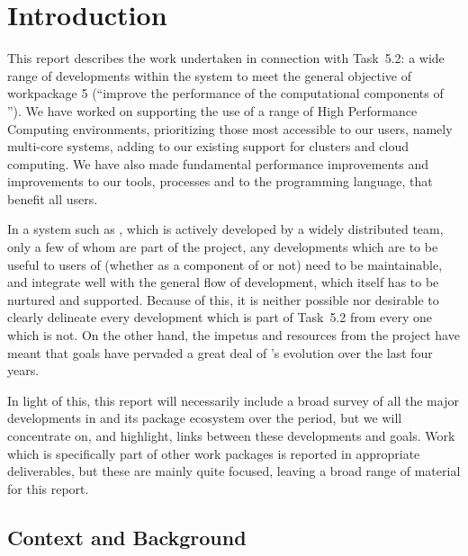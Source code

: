 

\section{Introduction}
This report describes the work undertaken in connection with Task~5.2:
  a wide range of developments within the \GAP system to meet the
  general objective of workpackage 5 (``improve the performance of the
  computational components of \ODK''). We have worked on supporting
  the use of a range of High Performance Computing environments,
  prioritizing those most accessible to our users, namely multi-core
  systems, adding to our existing support for clusters and cloud
  computing. We have also made fundamental performance improvements
  and improvements to our tools, processes and to the programming
  language, that benefit all \GAP users.

In a system such as \GAP, which is actively developed by a widely
distributed team, only a few of whom are part of the \ODK project, any
developments which are to be useful to users of \GAP (whether as a component of
\ODK or not) need to be maintainable, and
integrate well with the general flow of \GAP development, which itself
has to be nurtured and supported. Because of this, it is neither
possible nor desirable to clearly delineate every development which
is part of Task~5.2 from every one which is not. On the other hand,
the impetus and resources from the \ODK project have meant that \ODK
goals have pervaded a great deal of \GAP's evolution over the last
four years.

In light of this, this report will necessarily include  a broad
survey of all the major developments in \GAP and its package ecosystem
over the period, but we will concentrate on, and highlight, links between
these developments and \ODK goals. Work which is specifically part of
other work packages is reported in appropriate deliverables, but these
are mainly quite focused, leaving a broad range of material for this report.

\subsection{Context and Background}

